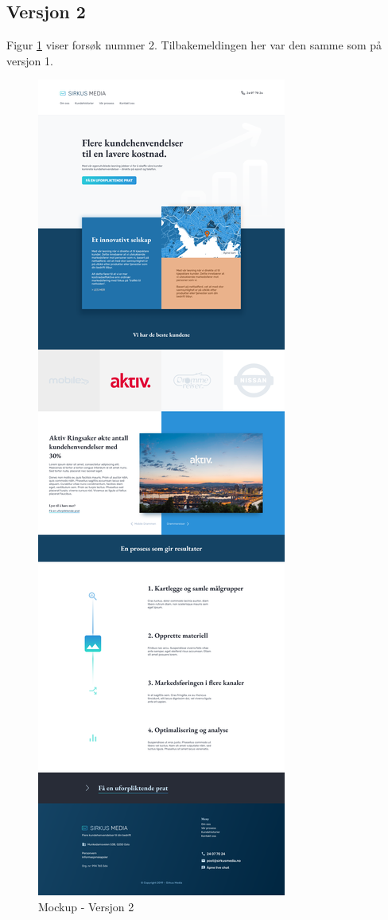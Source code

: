 \subsection{Versjon 2}
Figur \ref{fig:mockup-v2} viser forsøk nummer 2. Tilbakemeldingen her var den samme som på versjon 1.
\begin{figure}[H]
    \centering
    \includegraphics[height=.85\textheight]{design/mockup2-draft3.png}
    \caption{Mockup - Versjon 2}
    \label{fig:mockup-v2}
\end{figure}

